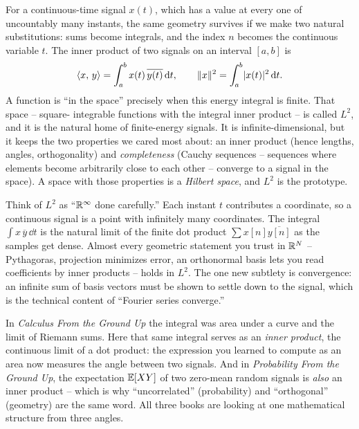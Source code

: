 For a continuous-time signal $x(t)$, which has a value at every one of uncountably many instants, the same
geometry survives if we make two natural substitutions: sums become integrals, and the index $n$
becomes the continuous variable $t$. The inner product of two signals on an interval $[a,b]$ is
\[
  \langle x,\, y \rangle = \int_a^b x(t)\,\overline{y(t)}\,\mathrm{d} t,
  \qquad \lVert x\rVert^2 = \int_a^b \lvert x(t)\rvert^2\,\mathrm{d} t .
\]
A function is ``in the space'' precisely when this energy integral is finite. That space -- square-
integrable functions with the integral inner product -- is called $L^2$, and it is the natural home
of finite-energy signals. It is infinite-dimensional, but it keeps the two properties we cared most
about: an inner product (hence lengths, angles, orthogonality) and \emph{completeness} (Cauchy
sequences -- sequences where elements become arbitrarily close to each other -- converge to a signal in the space). A space with those properties is a
\emph{Hilbert space}, and $L^2$ is the prototype.

\begin{intuitionbox}
Think of $L^2$ as ``$\mathbb{R}^\infty$ done carefully.'' Each instant $t$ contributes a coordinate, so a
continuous signal is a point with infinitely many coordinates. The integral $\int x\,\overline y\,\dd
t$ is the natural limit of the finite dot product $\sum x[n]\overline{y[n]}$ as the samples get dense.
Almost every geometric statement you trust in $\mathbb{R}^N$ -- Pythagoras, projection minimizes error, an
orthonormal basis lets you read coefficients by inner products -- holds in $L^2$. The one new
subtlety is convergence: an infinite sum of basis vectors must be shown to settle down to
the signal, which is the technical content of ``Fourier series converge.''
\end{intuitionbox}

\begin{connectionbox}
In \emph{Calculus From the Ground Up} the integral was area under a curve and the limit of Riemann
sums. Here that same integral serves as an \emph{inner product}, the continuous limit of a dot
product: the expression you learned to compute as an area now measures the angle between two
signals. And in \emph{Probability From the Ground Up}, the expectation $\operatorname{\mathbb{E}}[XY]$ of two zero-mean
random signals is \emph{also} an inner product -- which is why ``uncorrelated'' (probability) and
``orthogonal'' (geometry) are the same word. All three books are looking at one mathematical
structure from three angles.
\end{connectionbox}

